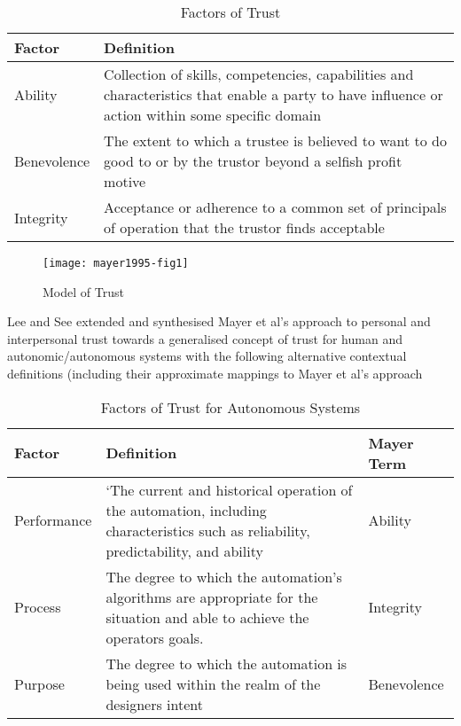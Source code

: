 \begin{table}\centering
  \caption[Factors of Trust]{Factors of Trust\cite{Mayer1995}}
  \label{tab:trust_factors}
  \begin{tabularx}{\textwidth}{p{2cm}X}\toprule
    Factor & Definition \\ \midrule
    Ability & Collection of skills, competencies, capabilities and characteristics that enable a party to have influence or action within some specific domain \\
    Benevolence & The extent to which a trustee is believed to want to do good to or by the trustor beyond a selfish profit motive\\
    Integrity & Acceptance or adherence to a common set of principals of operation that the trustor finds acceptable\\
    \bottomrule
  \end{tabularx}
\end{table}

\begin{figure}
  \texttt{[image: mayer1995-fig1]}
  \caption[Model of Trust]{Model of Trust \cite{Mayer1995}}
  \label{fig:mayer_trust_model}
\end{figure}

Lee and See \cite{Lee2004} extended and synthesised Mayer et al's approach to personal and interpersonal trust towards a generalised concept of trust for human and autonomic/autonomous systems with the following alternative contextual definitions (including their approximate mappings to Mayer et al's approach

\begin{table}
  \caption[Factors of Trust for Autonomous Systems]{Factors of Trust for Autonomous Systems\cite{Lee2004}}
  \label{tab:autonomous_trust_factors}
  \begin{tabularx}{\textwidth}{p{2cm}X p{2cm}}\toprule
    Factor & Definition & Mayer Term\\ \midrule
    Performance & `The current and historical operation of the automation, including characteristics such as reliability, predictability, and ability & Ability\\
    Process & The degree to which the automation's algorithms are appropriate for the situation and able to achieve the operators goals.
    & Integrity\\
    Purpose & The degree to which the automation is being used within the realm of the designers intent & Benevolence \\
    \bottomrule
  \end{tabularx}
\end{table}

